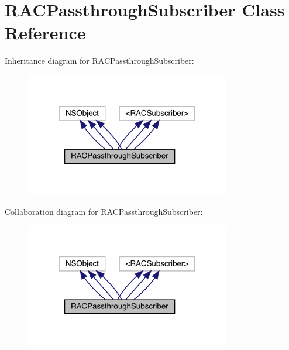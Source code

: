 \hypertarget{interface_r_a_c_passthrough_subscriber}{}\section{R\+A\+C\+Passthrough\+Subscriber Class Reference}
\label{interface_r_a_c_passthrough_subscriber}


Inheritance diagram for R\+A\+C\+Passthrough\+Subscriber\+:\nopagebreak
\begin{figure}[H]
\begin{center}
\leavevmode
\includegraphics[width=254pt]{interface_r_a_c_passthrough_subscriber__inherit__graph}
\end{center}
\end{figure}


Collaboration diagram for R\+A\+C\+Passthrough\+Subscriber\+:\nopagebreak
\begin{figure}[H]
\begin{center}
\leavevmode
\includegraphics[width=254pt]{interface_r_a_c_passthrough_subscriber__coll__graph}
\end{center}
\end{figure}

